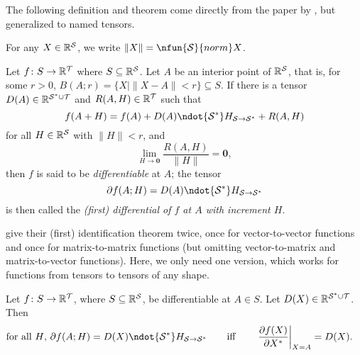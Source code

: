 The following definition and theorem come directly from the paper by \citet{magnus+neudecker:1985}, but generalized to named tensors.

For any $X \in \mathbb{R}^\mathcal{S}$, we write $\|X\| = \nfun{\mathcal{S}}{norm} X$.

\begin{definition}
  Let $f \colon S \rightarrow \mathbb{R}^\mathcal{T}$ where $S \subseteq \mathbb{R}^\mathcal{S}$.
  Let $A$ be an interior point of $\mathbb{R}^\mathcal{S}$, that is, for some $r > 0$, $B(A;r) = \{X \mid \|X-A\| < r\} \subseteq S$.
  If there is a tensor $D(A) \in \mathbb{R}^{\mathcal{S^*} \cup \mathcal{T}}$ and $R(A,H) \in \mathbb{R}^{\mathcal{T}}$ such that
  \begin{equation*}
    f(A + H) = f(A) + D(A) \ndot{\mathcal{S\inax}} H_{\mathcal{S} \rightarrow \mathcal{S\inax}} + R(A,H)
  \end{equation*}
  for all $H \in \mathbb{R}^\mathcal{S}$ with $\|H\| < r$, and
  \begin{equation*}
    \lim_{H \rightarrow \mathbf{0}} \frac{R(A,H)}{\|H\|} = \mathbf{0},
  \end{equation*}
  then $f$ is said to be \emph{differentiable} at $A$; the tensor
  \begin{equation*}
    \partial f(A; H) = D(A) \ndot{\mathcal{S\inax}} H_{\mathcal{S} \rightarrow \mathcal{S\inax}}
  \end{equation*}
  is then called the \emph{(first) differential of $f$ at $A$ with increment $H$}.
\end{definition}

\citeauthor{magnus+neudecker:1985} give their (first) identification theorem twice, once for vector-to-vector functions and once for matrix-to-matrix functions (but omitting vector-to-matrix and matrix-to-vector functions). Here, we only need one version, which works for functions from tensors to tensors of any shape.
\begin{theorem} \label{thm:identification}
  Let $f \colon S \rightarrow \mathbb{R}^\mathcal{T}$, where $S \subseteq \mathbb{R}^\mathcal{S}$, be differentiable at $A \in S$. Let $D(X) \in \mathbb{R}^{\mathcal{S}^* \cup \mathcal{T}}$. Then
\begin{align*}
\text{for all $H$,} \ \partial f(A; H) &= D(X) \ndot{\mathcal{S}\inax} H_{\mathcal{S}\rightarrow\mathcal{S}\inax} \qquad \text{iff} \qquad \left.\ddx{f(X)}\right|_{X=A} = D(X).
\end{align*}
\end{theorem}

